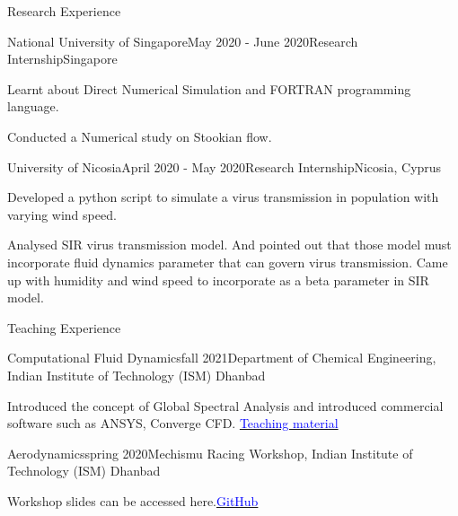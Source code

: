 \documentclass{resume} %
\begin{document}
\begin{rSection}{Research Experience}

\begin{rSubsection}{National University of Singapore}{May 2020 - June 2020}{Research Internship}{Singapore}
\item Learnt about Direct Numerical Simulation and FORTRAN programming language.
\item Conducted a Numerical study on Stookian flow. 
\end{rSubsection}
\begin{rSubsection}{University of Nicosia}{April 2020 - May 2020}{Research Internship}{Nicosia, Cyprus}
\item Developed a python script to simulate a virus transmission in population with varying wind speed. 
\item Analysed SIR virus transmission model. And pointed out that those model must incorporate fluid dynamics parameter that can govern virus transmission. Came up with humidity and wind speed to incorporate as a beta parameter in SIR model.  

\end{rSubsection}

\end{rSection}


\begin{rSection}{Teaching Experience}
\begin{rSubsection}{Computational Fluid Dynamics}{fall 2021}{Department of Chemical Engineering, Indian Institute of Technology (ISM) Dhanbad}
\item Introduced the concept of Global Spectral Analysis and introduced commercial software such as ANSYS, Converge CFD. \href{https://skill-lync.com/student-projects/rayleigh-taylor-instability-challenge-35}{\textcolor{blue}{Teaching material}}
\end{rSubsection}

\begin{rSubsection}{Aerodynamics}{spring 2020}{Mechismu Racing Workshop, Indian Institute of Technology (ISM) Dhanbad}
\item Workshop slides can be accessed here.\href{https://github.com/Sumanshekhar17/Mechismu-Racing-Aerodynamics}{\textcolor{blue}{GitHub}}
\end{rSubsection}
\end{rSection}
\end{document}
